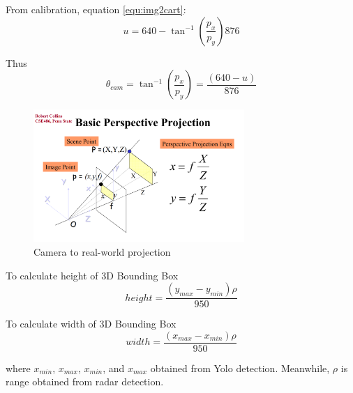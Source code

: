 From calibration, equation \ref{equ:img2cart}:
\begin{equation}\label{equ:2_img2cart2}
    u=640-\tan^{-1}(\frac{p_x}{p_y})876
\end{equation}

Thus
\begin{equation}\label{equ:2_cam_px}
    \theta_{cam}=
    \tan^{-1}(\frac{p_x}{p_y})=
    \frac
    {(640-u)}
    {876}
\end{equation}
\begin{figure}[hpbt]
    \centering
    \includegraphics[width=8cm]{Figures/cam_projection.png}%
    \caption{Camera to real-world projection}
    \label{fig:camera_projection}
\end{figure}

To calculate height of 3D Bounding Box
\begin{equation}\label{equ:2_cam_height}
    height=
    \frac
    {(y_{max}-y_{min})\rho}
    {950}
\end{equation}

To calculate width of 3D Bounding Box
\begin{equation}\label{equ:2_cam_width}
    width=
    \frac
    {(x_{max}-x_{min})\rho}
    {950}
\end{equation}

where $x_{min}$, $x_{max}$, $x_{min}$, and $x_{max}$ obtained from Yolo detection. 
Meanwhile, $\rho$ is range obtained from radar detection.



